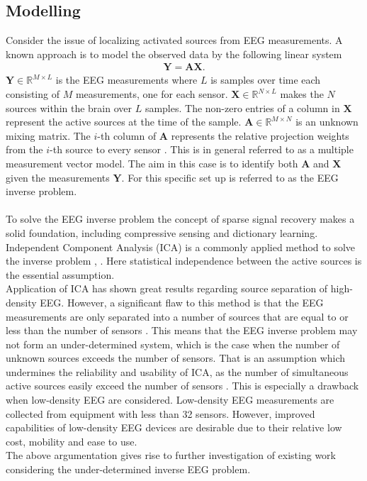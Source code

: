 \subsection{Modelling}
Consider the issue of localizing activated sources from EEG measurements. A known approach is to model the observed data by the following linear system 
\begin{align*}
\mathbf{Y} = \mathbf{AX}.
\end{align*}
$\mathbf{Y} \in \mathbb{R}^{M \times L}$ is the EEG measurements where $L$ is samples over time each consisting of $M$ measurements, one for each sensor. $\mathbf{X} \in \mathbb{R}^{N \times L}$ makes the $N$ sources within the brain over $L$ samples. The non-zero entries of a column in $\textbf{X}$ represent the active sources at the time of the sample. $\mathbf{A} \in \mathbb{R}^{M \times N}$ is an unknown mixing matrix. 
The $i$-th column of $\mathbf{A}$ represents the relative projection weights from the $i$-th source to every sensor \cite{phd2015}. 
This is in general referred to as a multiple measurement vector model. 
The aim in this case is to identify both $\mathbf{A}$ and $\mathbf{X}$ given the measurements $\mathbf{Y}$. 
For this specific set up is referred to as the EEG inverse problem.  
\\ \\
To solve the EEG inverse problem the concept of sparse signal recovery makes a solid foundation, including compressive sensing and dictionary learning. 
Independent Component Analysis (ICA) is a commonly applied method to solve the inverse problem \cite{Scott1996}, \cite{Scott1997}. Here statistical independence between the active sources is the essential assumption. 
\\
Application of ICA has shown great results regarding source separation of high-density EEG. 
However, a significant flaw to this method is that the EEG measurements are only separated into a number of sources that are equal to or less than the number of sensors \cite{Balkan2015}.
This means that the EEG inverse problem may not form an under-determined system, which is the case when the number of unknown sources exceeds the number of sensors. 
That is an assumption which undermines the reliability and usability of ICA, as the number of simultaneous active sources easily exceed the number of sensors \cite{phd2015}. 
This is especially a drawback when low-density EEG are considered. Low-density EEG measurements are collected from equipment with less than 32 sensors. 
However, improved capabilities of low-density EEG devices are desirable due to their relative low cost, mobility and ease to use. 
\\
The above argumentation gives rise to further investigation of existing work considering the under-determined inverse EEG problem. 

